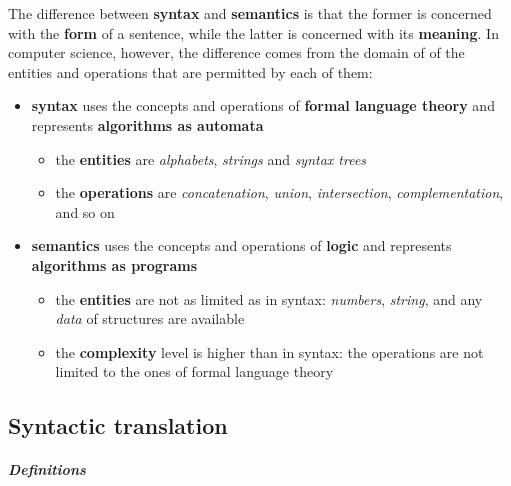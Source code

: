 \documentclass[english]{article}
\begin{document}
\bigskip
The difference between \textbf{syntax} and \textbf{semantics} is that the former is concerned with the \textbf{form} of a sentence, while the latter is concerned with its \textbf{meaning}.
In computer science, however, the difference comes from the domain of of the entities and operations that are permitted by each of them:

\begin{itemize}
  \item \textbf{syntax} uses the concepts and operations of \textbf{formal language theory} and represents \textbf{algorithms as automata}
        \begin{itemize}[label=\(\rightarrow\)]
          \item the \textbf{entities} are \textit{alphabets}, \textit{strings} and \textit{syntax trees}
          \item the \textbf{operations} are \textit{concatenation}, \textit{union}, \textit{intersection}, \textit{complementation}, and so on
        \end{itemize}
  \item \textbf{semantics} uses the concepts and operations of \textbf{logic} and represents \textbf{algorithms as programs}
        \begin{itemize}[label=\(\rightarrow\)]
          \item the \textbf{entities} are not as limited as in syntax: \textit{numbers}, \textit{string}, and any \textit{data} of structures are available
          \item the \textbf{complexity} level is higher than in syntax: the operations are not limited to the ones of formal language theory
        \end{itemize}
\end{itemize}

\subsection{Syntactic translation}

\subparagraph*{Definitions}
\end{document}
